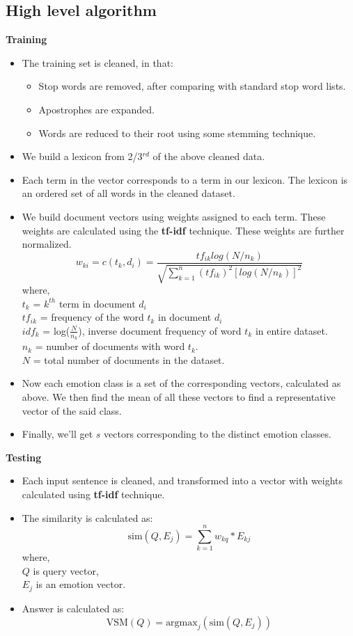 \subsection{High level algorithm}
\textbf{Training}
\begin{itemize}
\item The training set is cleaned, in that:
	\begin{itemize}
	\item Stop words are removed, after comparing with standard stop word lists.
	\item Apostrophes are expanded.
	\item Words are reduced to their root using some stemming technique.
	\end{itemize}
\item We build a lexicon from 2/3$^{rd}$ of the above cleaned data.
\item Each term in the vector corresponds to a term in our lexicon. The lexicon is an ordered set of all words in the cleaned dataset.
\item We build document vectors using weights assigned to each term. These weights are calculated using the \textbf{tf-idf} technique. These weights are further normalized.
$$
w_{ki}=c(t_k,d_i)=\frac{tf_{ik}log(N/n_k)}{\sqrt{\sum_{k=1}^{n} (tf_{ik})^{2}[log(N/n_k)]^2}}
$$
where, \\
$t_k$ = $k^{th}$ term in document $d_i$ \\
$tf_{ik}$ = frequency of the word $t_k$ in document $d_i$ \\
$idf_k$ = log($\frac{N}{n_k}$), inverse document frequency of word $t_k$ in  entire dataset. \\
$n_k$ = number of documents with word $t_k$. \\
$N$ = total number of documents in the dataset.
\item Now each emotion class is a set of the corresponding vectors, calculated as above. We then find the mean of all these vectors to find a representative vector of the said class.
\item Finally, we'll get $s$ vectors corresponding to the distinct emotion classes.
\end{itemize}
\textbf{Testing}
\begin{itemize}
\item Each input sentence is cleaned, and transformed into a vector with weights calculated using \textbf{tf-idf} technique.
\item The similarity is calculated as:
$$
\mbox{sim}(Q,E_j) = \sum_{k=1}^{n} w_{kq}*E_{kj}
$$
where,\\
$Q$ is query vector, \\
$E_j$ is an emotion vector.
\item Answer is calculated as:
$$
\mbox{VSM}(Q) = \mbox{argmax}_{j} (\mbox{sim}(Q, E_j))
$$
\end{itemize}
